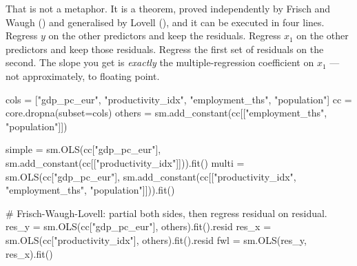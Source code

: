 \documentclass[
  letterpaper,
  10pt,
  twoside,
  openright,
  numbers=noenddot,
  chapterprefix=true]{scrbook}
\newenvironment{Shaded}{}{}
\newcommand{\CommentTok}[1]{\textcolor[rgb]{0.42,0.45,0.49}{#1}}
\newcommand{\NormalTok}[1]{\textcolor[rgb]{0.14,0.16,0.18}{#1}}
\newcommand{\OperatorTok}[1]{\textcolor[rgb]{0.14,0.16,0.18}{#1}}
\newcommand{\StringTok}[1]{\textcolor[rgb]{0.01,0.18,0.38}{#1}}
\begin{document}
That is not a metaphor. It is a theorem, proved independently by Frisch
and Waugh () and generalised by Lovell
(), and it can be executed in four lines.
Regress \(y\) on the other predictors and keep the residuals. Regress
\(x_1\) on the other predictors and keep those residuals. Regress the
first set of residuals on the second. The slope you get is
\emph{exactly} the multiple-regression coefficient on \(x_1\) --- not
approximately, to floating point.

\label{check-fwl}
\begin{Shaded}
\begin{Highlighting}[]
\NormalTok{cols }\OperatorTok{=}\NormalTok{ [}\StringTok{"gdp\_pc\_eur"}\NormalTok{, }\StringTok{"productivity\_idx"}\NormalTok{, }\StringTok{"employment\_ths"}\NormalTok{, }\StringTok{"population"}\NormalTok{]}
\NormalTok{cc }\OperatorTok{=}\NormalTok{ core.dropna(subset}\OperatorTok{=}\NormalTok{cols)}
\NormalTok{others }\OperatorTok{=}\NormalTok{ sm.add\_constant(cc[[}\StringTok{"employment\_ths"}\NormalTok{, }\StringTok{"population"}\NormalTok{]])}

\NormalTok{simple }\OperatorTok{=}\NormalTok{ sm.OLS(cc[}\StringTok{"gdp\_pc\_eur"}\NormalTok{], sm.add\_constant(cc[[}\StringTok{"productivity\_idx"}\NormalTok{]])).fit()}
\NormalTok{multi }\OperatorTok{=}\NormalTok{ sm.OLS(cc[}\StringTok{"gdp\_pc\_eur"}\NormalTok{],}
\NormalTok{               sm.add\_constant(cc[[}\StringTok{"productivity\_idx"}\NormalTok{, }\StringTok{"employment\_ths"}\NormalTok{, }\StringTok{"population"}\NormalTok{]])).fit()}

\CommentTok{\# Frisch{-}Waugh{-}Lovell: partial both sides, then regress residual on residual.}
\NormalTok{res\_y }\OperatorTok{=}\NormalTok{ sm.OLS(cc[}\StringTok{"gdp\_pc\_eur"}\NormalTok{], others).fit().resid}
\NormalTok{res\_x }\OperatorTok{=}\NormalTok{ sm.OLS(cc[}\StringTok{"productivity\_idx"}\NormalTok{], others).fit().resid}
\NormalTok{fwl }\OperatorTok{=}\NormalTok{ sm.OLS(res\_y, res\_x).fit()}


\end{Highlighting}
\end{Shaded}
\end{document}
